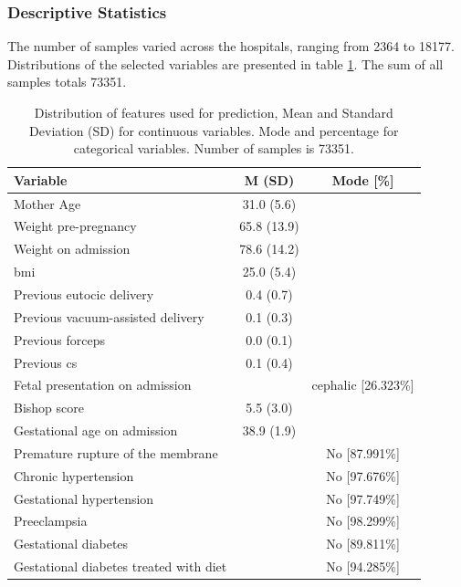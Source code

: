 \subsubsection{Descriptive Statistics}
The number of samples varied across the hospitals, ranging from 2364 to 18177. Distributions of the selected variables are presented in table \ref{tab:obs_material_1}. The sum of all samples totals 73351.

\begin{table}[htbp]
  \centering
  \caption{Distribution of features used for prediction, Mean and Standard Deviation (SD) for continuous variables. Mode and percentage for categorical variables. Number of samples is 73351.}
  \label{tab:obs_material_1}
   \renewcommand{\arraystretch}{1.02} %
  \setlength{\tabcolsep}{12pt} %
    \begin{tabular}{m{15em}cc}
    \toprule
        Variable & M (SD) & Mode [\%] \\ 
        \hline
        Mother Age & 31.0 (5.6) & ~ \\ 
        Weight pre-pregnancy & 65.8 (13.9) & ~ \\ 
        Weight on admission & 78.6 (14.2) & ~ \\ 
        \ac{bmi} & 25.0 (5.4) & ~ \\ 
        Previous eutocic delivery & 0.4 (0.7) & ~ \\ 
        Previous vacuum-assisted delivery & 0.1 (0.3) & ~ \\ 
        Previous forceps & 0.0 (0.1) & ~ \\ 
        Previous \ac{cs} & 0.1 (0.4) & ~ \\ 
        Fetal presentation on admission & ~ & cephalic [26.323\%] \\ 
        Bishop score & 5.5 (3.0) & ~ \\ 
        Gestational age on admission & 38.9 (1.9) & ~ \\ 
        Premature rupture of the membrane & ~ & No [87.991\%] \\ 
        Chronic hypertension & ~ & No [97.676\%] \\ 
        Gestational hypertension & ~ & No [97.749\%] \\ 
        Preeclampsia & ~ & No [98.299\%] \\ 
        Gestational diabetes & ~ & No [89.811\%] \\ 
        Gestational diabetes treated with diet & ~ & No [94.285\%] \\ 

\end{tabular}
\end{table}
